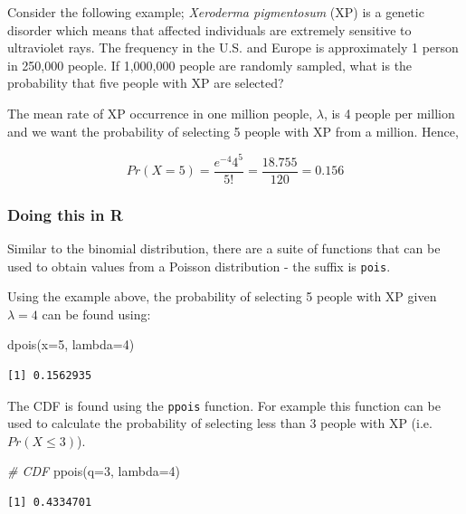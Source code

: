 \documentclass[
  oneside]{krantz}
\newenvironment{Shaded}{\begin{snugshade}}{\end{snugshade}}
\newcommand{\AttributeTok}[1]{\textcolor[rgb]{0.77,0.63,0.00}{#1}}
\newcommand{\CommentTok}[1]{\textcolor[rgb]{0.56,0.35,0.01}{\textit{#1}}}
\newcommand{\DecValTok}[1]{\textcolor[rgb]{0.00,0.00,0.81}{#1}}
\newcommand{\FunctionTok}[1]{\textcolor[rgb]{0.00,0.00,0.00}{#1}}
\newcommand{\NormalTok}[1]{#1}
\begin{document}
Consider the following example; \textit{Xeroderma pigmentosum} (XP) is a genetic disorder which means that affected individuals are extremely sensitive to ultraviolet rays. The frequency in the U.S. and Europe is approximately 1 person in 250,000 people. If 1,000,000 people are randomly sampled, what is the probability that five people with XP are selected?

The mean rate of XP occurrence in one million people, \(\lambda\), is 4 people per million and we want the probability of selecting 5 people with XP from a million. Hence,

\[Pr(X=5) = \frac{e^{-4}4^5}{5!} = \frac{18.755}{120} = 0.156\]

\hypertarget{doing-this-in-r-5}{%
\subsubsection{Doing this in R}\label{doing-this-in-r-5}}

Similar to the binomial distribution, there are a suite of functions that can be used to obtain values from a Poisson distribution - the suffix is \texttt{pois}.

Using the example above, the probability of selecting 5 people with XP given \(\lambda=4\) can be found using:

\begin{Shaded}
\begin{Highlighting}[]
\FunctionTok{dpois}\NormalTok{(}\AttributeTok{x=}\DecValTok{5}\NormalTok{, }\AttributeTok{lambda=}\DecValTok{4}\NormalTok{)}
\end{Highlighting}
\end{Shaded}

\begin{verbatim}
[1] 0.1562935
\end{verbatim}

The CDF is found using the \texttt{ppois} function. For example this function can be used to calculate the probability of selecting less than 3 people with XP (i.e.~\(Pr(X \le 3)\)).

\begin{Shaded}
\begin{Highlighting}[]
\CommentTok{\# CDF }
\FunctionTok{ppois}\NormalTok{(}\AttributeTok{q=}\DecValTok{3}\NormalTok{, }\AttributeTok{lambda=}\DecValTok{4}\NormalTok{)}
\end{Highlighting}
\end{Shaded}

\begin{verbatim}
[1] 0.4334701
\end{verbatim}
\end{document}
